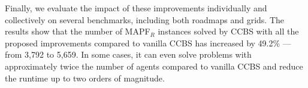 \documentclass[letterpaper]{article} %
\newcommand\roni[1]{\nb{\textbf{Roni:}}{orange}{#1}}
\newcommand{\ccbs}{\ac{CCBS}\xspace}
\newcommand{\mapfr}{{MAPF}$_R$\xspace}
\newcommand{\mapf}{\ac{MAPF}\xspace}
\newcommand{\ds}{\ac{DS}\xspace}
\begin{document}
Finally, we evaluate the impact of these improvements individually and collectively on several benchmarks, including both roadmaps and grids.
The results show that the number of \mapfr instances solved by \ccbs with all the proposed improvements compared to vanilla CCBS
has increased by 49.2\% --- from 3,792 to 5,659.
In some cases, it can even solve problems with approximately twice the number of agents compared to vanilla CCBS and reduce the runtime up to two orders of magnitude.








\end{document}
